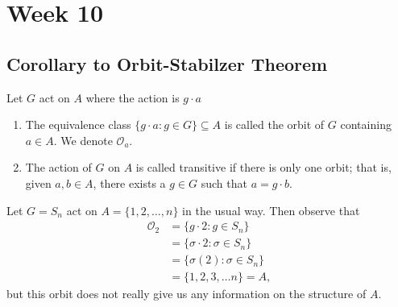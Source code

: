 \section{Week 10}

\subsection{Corollary to Orbit-Stabilzer Theorem} 
\begin{definition}[ ]
    Let \( G  \) act on \( A  \) where the action is \( g \cdot a  \)
    \begin{enumerate}
        \item[(1)] The equivalence class \( \{  g \cdot a : g \in G  \} \subseteq A   \) is called the orbit of \( G  \) containing \( a \in A  \). We denote \( \mathcal{O}_{a} \).
        \item[(2)] The action of \( G  \) on \( A  \) is called transitive if there is only one orbit; that is, given \( a,b \in A  \), there exists a \( g \in G  \) such that \( a = g \cdot b  \).
    \end{enumerate}
\end{definition}

\begin{eg}
   Let \( G = {S}_{n} \) act on \( A = \{  1,2, \dots, n \}  \) in the usual way. Then observe that  
   \begin{align*}
       {\mathcal{O}}_{2} &= \{  g \cdot 2 : g \in {S}_{n}  \}  \\
       &= \{  \sigma \cdot 2 : \sigma \in {S}_{n} \}  \\
       &= \{  \sigma(2) : \sigma \in {S}_{n} \} \\
       &= \{ 1,2,3,\dots n \}  = A,
    \end{align*}
    but this orbit does not really give us any information on the structure of \( A  \).
\end{eg}

